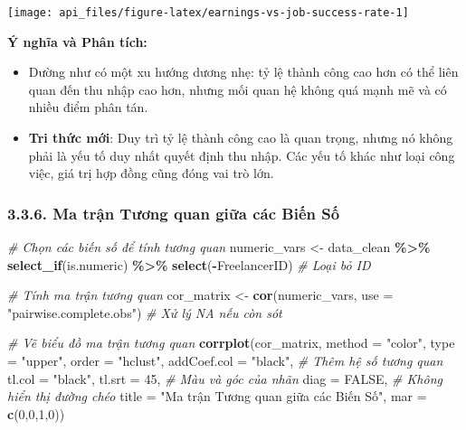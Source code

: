 \documentclass[
]{article}
\newenvironment{Shaded}{\begin{snugshade}}{\end{snugshade}}
\newcommand{\AttributeTok}[1]{\textcolor[rgb]{0.13,0.29,0.53}{#1}}
\newcommand{\CommentTok}[1]{\textcolor[rgb]{0.56,0.35,0.01}{\textit{#1}}}
\newcommand{\ConstantTok}[1]{\textcolor[rgb]{0.56,0.35,0.01}{#1}}
\newcommand{\DecValTok}[1]{\textcolor[rgb]{0.00,0.00,0.81}{#1}}
\newcommand{\FunctionTok}[1]{\textcolor[rgb]{0.13,0.29,0.53}{\textbf{#1}}}
\newcommand{\NormalTok}[1]{#1}
\newcommand{\OtherTok}[1]{\textcolor[rgb]{0.56,0.35,0.01}{#1}}
\newcommand{\SpecialCharTok}[1]{\textcolor[rgb]{0.81,0.36,0.00}{\textbf{#1}}}
\newcommand{\StringTok}[1]{\textcolor[rgb]{0.31,0.60,0.02}{#1}}
\begin{document}
\begin{center}\texttt{[image: api\_files/figure-latex/earnings-vs-job-success-rate-1]} \end{center}

\textbf{Ý nghĩa và Phân tích:}

\begin{itemize}
\item
  Dường như có một xu hướng dương nhẹ: tỷ lệ thành công cao hơn có thể
  liên quan đến thu nhập cao hơn, nhưng mối quan hệ không quá mạnh mẽ và
  có nhiều điểm phân tán.
\item
  \textbf{Tri thức mới}: Duy trì tỷ lệ thành công cao là quan trọng,
  nhưng nó không phải là yếu tố duy nhất quyết định thu nhập. Các yếu tố
  khác như loại công việc, giá trị hợp đồng cũng đóng vai trò lớn.
\end{itemize}

\subsubsection{3.3.6. Ma trận Tương quan giữa các Biến
Số}\label{ma-trux1eadn-tux1b0ux1a1ng-quan-giux1eefa-cuxe1c-biux1ebfn-sux1ed1}

\begin{Shaded}
\begin{Highlighting}[]
\CommentTok{\# Chọn các biến số để tính tương quan}
\NormalTok{numeric\_vars }\OtherTok{\textless{}{-}}\NormalTok{ data\_clean }\SpecialCharTok{\%\textgreater{}\%}
  \FunctionTok{select\_if}\NormalTok{(is.numeric) }\SpecialCharTok{\%\textgreater{}\%}
  \FunctionTok{select}\NormalTok{(}\SpecialCharTok{{-}}\NormalTok{FreelancerID) }\CommentTok{\# Loại bỏ ID}

\CommentTok{\# Tính ma trận tương quan}
\NormalTok{cor\_matrix }\OtherTok{\textless{}{-}} \FunctionTok{cor}\NormalTok{(numeric\_vars, }\AttributeTok{use =} \StringTok{"pairwise.complete.obs"}\NormalTok{) }\CommentTok{\# Xử lý NA nếu còn sót}

\CommentTok{\# Vẽ biểu đồ ma trận tương quan}
\FunctionTok{corrplot}\NormalTok{(cor\_matrix, }\AttributeTok{method =} \StringTok{"color"}\NormalTok{, }\AttributeTok{type =} \StringTok{"upper"}\NormalTok{, }\AttributeTok{order =} \StringTok{"hclust"}\NormalTok{,}
         \AttributeTok{addCoef.col =} \StringTok{"black"}\NormalTok{, }\CommentTok{\# Thêm hệ số tương quan}
         \AttributeTok{tl.col =} \StringTok{"black"}\NormalTok{, }\AttributeTok{tl.srt =} \DecValTok{45}\NormalTok{, }\CommentTok{\# Màu và góc của nhãn}
         \AttributeTok{diag =} \ConstantTok{FALSE}\NormalTok{, }\CommentTok{\# Không hiển thị đường chéo}
         \AttributeTok{title =} \StringTok{"Ma trận Tương quan giữa các Biến Số"}\NormalTok{, }\AttributeTok{mar =} \FunctionTok{c}\NormalTok{(}\DecValTok{0}\NormalTok{,}\DecValTok{0}\NormalTok{,}\DecValTok{1}\NormalTok{,}\DecValTok{0}\NormalTok{))}
\end{Highlighting}
\end{Shaded}
\end{document}
